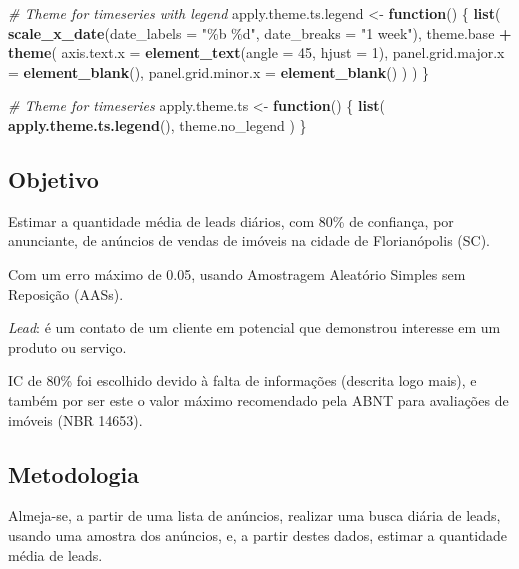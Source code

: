 \documentclass[
]{article}
\newenvironment{Shaded}{\begin{snugshade}}{\end{snugshade}}
\newcommand{\AttributeTok}[1]{\textcolor[rgb]{0.13,0.29,0.53}{#1}}
\newcommand{\CommentTok}[1]{\textcolor[rgb]{0.56,0.35,0.01}{\textit{#1}}}
\newcommand{\ControlFlowTok}[1]{\textcolor[rgb]{0.13,0.29,0.53}{\textbf{#1}}}
\newcommand{\DecValTok}[1]{\textcolor[rgb]{0.00,0.00,0.81}{#1}}
\newcommand{\FunctionTok}[1]{\textcolor[rgb]{0.13,0.29,0.53}{\textbf{#1}}}
\newcommand{\NormalTok}[1]{#1}
\newcommand{\OtherTok}[1]{\textcolor[rgb]{0.56,0.35,0.01}{#1}}
\newcommand{\SpecialCharTok}[1]{\textcolor[rgb]{0.81,0.36,0.00}{\textbf{#1}}}
\newcommand{\StringTok}[1]{\textcolor[rgb]{0.31,0.60,0.02}{#1}}
\begin{document}
\begin{Shaded}
\begin{Highlighting}[]
\CommentTok{\# Theme for timeseries with legend}
\NormalTok{apply.theme.ts.legend }\OtherTok{\textless{}{-}} \ControlFlowTok{function}\NormalTok{() \{}
  \FunctionTok{list}\NormalTok{(}
    \FunctionTok{scale\_x\_date}\NormalTok{(}\AttributeTok{date\_labels =} \StringTok{"\%b \%d"}\NormalTok{, }\AttributeTok{date\_breaks =} \StringTok{"1 week"}\NormalTok{),}
\NormalTok{    theme.base }\SpecialCharTok{+}
      \FunctionTok{theme}\NormalTok{(}
        \AttributeTok{axis.text.x =} \FunctionTok{element\_text}\NormalTok{(}\AttributeTok{angle =} \DecValTok{45}\NormalTok{, }\AttributeTok{hjust =} \DecValTok{1}\NormalTok{),}
        \AttributeTok{panel.grid.major.x =} \FunctionTok{element\_blank}\NormalTok{(),}
        \AttributeTok{panel.grid.minor.x =} \FunctionTok{element\_blank}\NormalTok{()}
\NormalTok{      )}
\NormalTok{  )}
\NormalTok{\}}


\CommentTok{\# Theme for timeseries}
\NormalTok{apply.theme.ts }\OtherTok{\textless{}{-}} \ControlFlowTok{function}\NormalTok{() \{}
  \FunctionTok{list}\NormalTok{(}
    \FunctionTok{apply.theme.ts.legend}\NormalTok{(),}
\NormalTok{    theme.no\_legend}
\NormalTok{  )}
\NormalTok{\}}
\end{Highlighting}
\end{Shaded}

\subsection{Objetivo}\label{objetivo}

Estimar a quantidade média de leads diários, com 80\% de confiança, por
anunciante, de anúncios de vendas de imóveis na cidade de Florianópolis
(SC).

Com um erro máximo de 0.05, usando Amostragem Aleatório Simples sem
Reposição (AASs).

\emph{Lead}: é um contato de um cliente em potencial que demonstrou
interesse em um produto ou serviço.

IC de 80\% foi escolhido devido à falta de informações (descrita logo
mais), e também por ser este o valor máximo recomendado pela ABNT para
avaliações de imóveis (NBR 14653).

\subsection{Metodologia}\label{metodologia}

Almeja-se, a partir de uma lista de anúncios, realizar uma busca diária
de leads, usando uma amostra dos anúncios, e, a partir destes dados,
estimar a quantidade média de leads.
\end{document}
